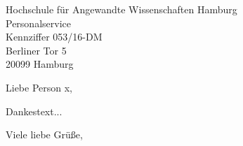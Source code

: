 \documentclass[
               DIV=15,
               fontsize=10pt,
               parskip=half,
               enlargefirstpage=true,
               fromalign=right,
               fromrule=afteraddress,
               fromlogo,
              ]{scrlttr2}
\begin{document}

\begin{letter}{Hochschule für Angewandte Wissenschaften Hamburg\\
               Personalservice\\
               Kennziffer 053/16-DM\\
               Berliner Tor 5\\
               20099 Hamburg}

\opening{Liebe Person x,}
Dankestext...
\closing{Viele liebe Grüße,}




\end{letter}
\end{document}
